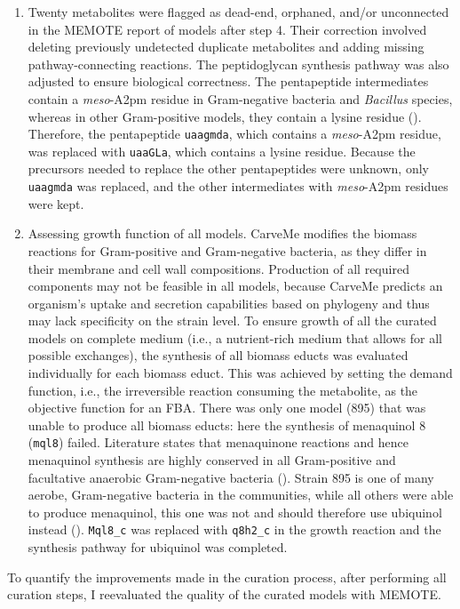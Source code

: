 \begin{enumerate}
    \item Twenty metabolites were flagged as dead-end, orphaned, and/or unconnected in the MEMOTE report of models after step 4. Their correction involved deleting previously undetected duplicate metabolites and adding missing pathway-connecting reactions. The peptidoglycan synthesis pathway was also adjusted to ensure biological correctness. The pentapeptide intermediates contain a \textit{meso}-A2pm residue in Gram-negative bacteria and \textit{Bacillus} species, whereas in other Gram-positive models, they contain a lysine residue (\cite{bouhss_biosynthesis_2008}). Therefore, the pentapeptide \texttt{uaagmda}, which contains a \textit{meso}-A2pm residue, was replaced with \texttt{uaaGLa}, which contains a lysine residue. Because the precursors needed to replace the other pentapeptides were unknown, only \texttt{uaagmda} was replaced, and the other intermediates with \textit{meso}-A2pm residues were kept.
    \item Assessing growth function of all models. CarveMe modifies the biomass reactions for Gram-positive and Gram-negative bacteria, as they differ in their membrane and cell wall compositions. Production of all required components may not be feasible in all models, because CarveMe predicts an organism's uptake and secretion capabilities based on phylogeny and thus may lack specificity on the strain level. To ensure growth of all the curated models on complete medium (i.e., a nutrient-rich medium that allows for all possible exchanges), the synthesis of all biomass educts was evaluated individually for each biomass educt. This was achieved by setting the demand function, i.e., the irreversible reaction consuming the metabolite, as the objective function for an FBA. There was only one model (895) that was unable to produce all biomass educts: here the synthesis of menaquinol 8 (\texttt{mql8}) failed. Literature states that menaquinone reactions and hence menaquinol synthesis are highly conserved in all Gram-positive and facultative anaerobic Gram-negative bacteria (\cite{boersch_menaquinone_2018}). Strain 895 is one of many aerobe, Gram-negative bacteria in the communities, while all others were able to produce menaquinol, this one was not and should therefore use ubiquinol instead (\cite{pelosi_ubiquinone_2019}). \texttt{Mql8\_c} was replaced with \texttt{q8h2\_c} in the growth reaction and the synthesis pathway for ubiquinol was completed.
\end{enumerate}

To quantify the improvements made in the curation process, after performing all curation steps, I reevaluated the quality of the curated models with MEMOTE. 
